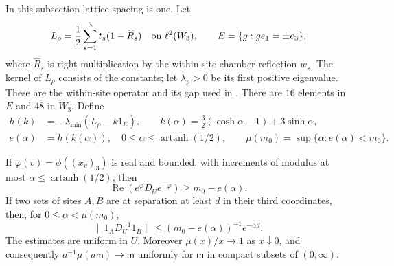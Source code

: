 \documentclass[11pt,letterpaper,reqno]{amsart}
\makeatletter
\theoremstyle{definition}
\newcommand{\ms@minorstart}{%
  \pushQED{\qed}\renewcommand{\qedsymbol}{$\blacksquare$}}
\newenvironment{lemma}[1][]{\ms@minorstart\ms@lemma[#1]}
  {\popQED\endms@lemma}
\theoremstyle{remark}
\makeatother
\begin{document}
In this subsection lattice spacing is one. Let
\[
 L_\rho=\frac12\sum_{s=1}^3t_s(1-\widehat R_s)
                      \quad\hbox{on }\ell^2(W_3),
 \qquad E=\{g:ge_1=\pm e_3\},
\]
where $\widehat R_s$ is right multiplication by the
within-site chamber reflection $w_s$. The kernel of
$L_\rho$ consists of the constants; let $\lambda_\rho>0$
be its first positive eigenvalue. These are the
within-site operator and its gap used in
\cite[Section 5]{QCDM1}.
There are $16$ elements in $E$ and $48$ in $W_3$.
Define
\begin{equation}\label{C-400-3}
 \begin{split}
 h(k)&=-\lambda_{\min}(L_\rho-k1_E),\qquad
 k(\alpha)=\tfrac32(\cosh\alpha-1)+3\sinh\alpha,\\
 e(\alpha)&=h(k(\alpha)),\quad
 0\le\alpha\le\operatorname{artanh}(1/2),\qquad
 \mu(m_0)=\sup\{\alpha:e(\alpha)<m_0\}.
 \end{split}
\end{equation}

\begin{lemma}[Directional decay]\label{C-400-11}\label{C-400-12}
If $\varphi(v)=\phi((x_v)_3)$ is real and bounded, with increments of modulus
at most $\alpha\le\operatorname{artanh}(1/2)$, then
\[
 \operatorname{Re}(e^\varphi D_Ue^{-\varphi})
                                      \ge m_0-e(\alpha).
\]
If two sets of sites $A,B$ are at separation at least
$d$ in their third coordinates, then, for
$0\le\alpha<\mu(m_0)$,
\[
 \|1_AD_U^{-1}1_B\|
       \le(m_0-e(\alpha))^{-1}e^{-\alpha d}.
\]
The estimates are uniform in $U$. Moreover
$\mu(x)/x\to1$ as $x\downarrow0$, and consequently
$a^{-1}\mu(a\mathsf m)\to\mathsf m$ uniformly for
$\mathsf m$ in compact subsets of $(0,\infty)$.
\end{lemma}
\end{document}
